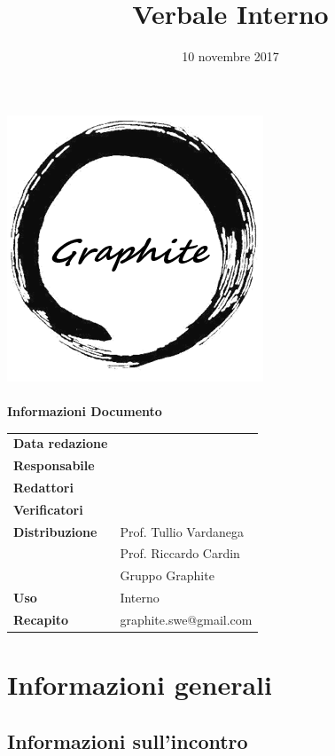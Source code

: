 \documentclass[openany,12pt,a4paper]{article}
\title{Verbale Interno}
\author{}
\date{10 novembre 2017}
\begin{document}
	\makeatletter
	\begin{titlepage}
		\setlength{\headsep}{0pt}  
		\begin{center}
			\includegraphics[width=0.5\linewidth]{Logo.png}\\[1em]
			{\huge \bfseries  \@title }\\[10ex]
			\textbf{\Large Informazioni Documento} \\[2em]
			\bgroup
			\def\arraystretch{1.5}
			\begin{tabular}{l|l}
				\textbf{Data redazione} & \large \@date \\
				\textbf{Responsabile} &  \\
				\textbf{Redattori} &  \\
				\textbf{Verificatori} &  \\
				\textbf{Distribuzione} & Prof. Tullio Vardanega \\
				 & Prof. Riccardo Cardin \\
				 & Gruppo Graphite \\
				\textbf{Uso} & Interno \\
				\textbf{Recapito} & graphite.swe@gmail.com \\
			\end{tabular}
		\egroup
		\end{center}
	\end{titlepage}
	\makeatother

	\thispagestyle{empty}
	\newpage
	
	\tableofcontents
	\newpage
	
	\section{Informazioni generali}
	
	\subsection{Informazioni sull'incontro}
	
\end{document}
